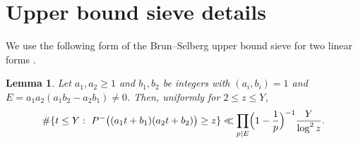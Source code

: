 \documentclass[11pt]{amsart}
\newtheorem{lemma}[theorem]{Lemma}
\theoremstyle{definition}
\theoremstyle{remark}
\begin{document}
\appendix

\section{Upper bound sieve details}\label{app:sieve}

We use the following form of the Brun--Selberg upper bound sieve for two linear forms \cite[Thm.~2.2]{HR74}.

\begin{lemma}\label{lem:twoforms}
Let $a_1,a_2\ge1$ and $b_1,b_2$ be integers with $(a_i,b_i)=1$ and $E=a_1a_2(a_1b_2-a_2b_1)\ne0$. Then, uniformly for $2\le z\le Y$,
\[
\#\{t\le Y:\ P^-\bigl((a_1t+b_1)(a_2t+b_2)\bigr)\ge z\}\ll\prod_{p\mid E}\Bigl(1-\frac1p\Bigr)^{-1}\frac{Y}{\log^2z}.
\]
\end{lemma}
\end{document}
